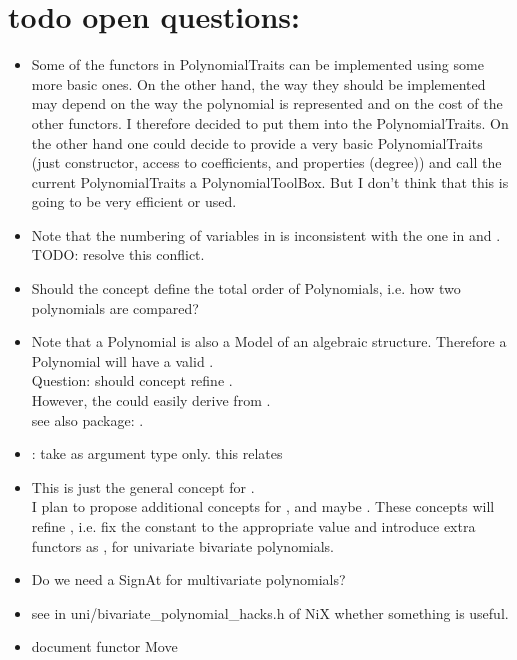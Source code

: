 \section{todo open questions:}

\begin{itemize} 
\item Some of the functors in PolynomialTraits can be implemented using some more basic ones. 
      On the other hand, the way they should be implemented may depend on  the way the polynomial is 
      represented and on the cost of the other functors. 
      I therefore decided to put them into the PolynomialTraits. 
      On the other hand one could decide to provide a very basic PolynomialTraits 
      (just constructor, access to coefficients, and properties (degree)) and call the current 
      PolynomialTraits a PolynomialToolBox. But I don't think that this is going to be very efficient 
      or used. 

\item Note that the numbering of variables in  is inconsistent
      with the one in  and . \\
      TODO: resolve this conflict. 

\item Should the concept define the total order of Polynomials, i.e. how two polynomials are compared? 

\item Note that a Polynomial is also a Model of an algebraic structure. Therefore a Polynomial will have a
       valid . \\
      Question: should concept  refine .\\
      However, the  could easily derive from .\\
      see also package: . 

\item {}: take  as argument type only.
      this relates  

\item This is just the general concept for .  \\
      I plan to propose additional concepts for , and maybe .     
      These concepts will refine , i.e. fix the constant  to the appropriate value 
      and introduce extra functors as , for univariate bivariate polynomials. 

\item Do we need a SignAt for multivariate polynomials?
\item see in uni/bivariate\_polynomial\_hacks.h of NiX whether something is useful.
\item document functor Move 
\end{itemize}
